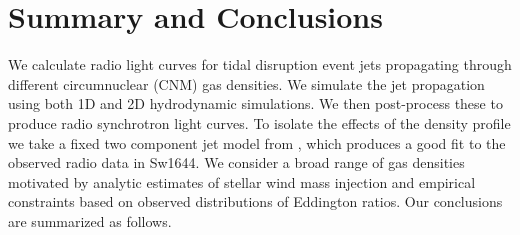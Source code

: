 \documentclass[usenatbib,fleqn]{mnras}
\begin{document}
\section{Summary and Conclusions}
\label{sec:conc}

We calculate radio light curves for tidal disruption event jets
propagating through different circumnuclear (CNM) gas densities. We
simulate the jet propagation using both 1D and 2D hydrodynamic
simulations. We then post-process these to produce radio synchrotron
light curves. To isolate the effects of the density profile we take a
fixed two component jet model from \citet{Mimica+2015}, which produces
a good fit to the observed radio data in Sw1644. We
consider a broad range of gas densities motivated by analytic
estimates of stellar wind mass injection and empirical constraints
based on observed distributions of Eddington ratios. Our conclusions
are summarized as follows.
\end{document}
